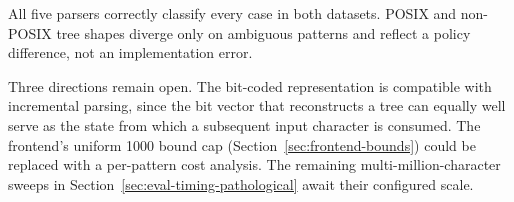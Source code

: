 All five parsers correctly classify every case in both datasets.
POSIX and non-POSIX tree shapes diverge only on ambiguous patterns and
reflect a policy difference, not an implementation error.

Three directions remain open. The bit-coded representation is
compatible with incremental parsing, since the bit vector that
reconstructs a tree can equally well serve as the state from which a
subsequent input character is consumed. The frontend's uniform 1000
bound cap (Section~\ref{sec:frontend-bounds}) could be replaced with a
per-pattern cost analysis. The remaining multi-million-character
sweeps in Section~\ref{sec:eval-timing-pathological} await their
configured scale.